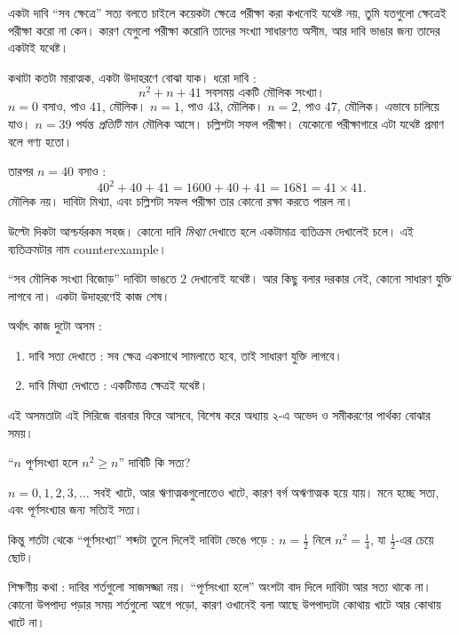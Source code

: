 \documentclass[11pt]{article}
\begin{document}
\begin{idea}[উদাহরণ দিয়ে দেখানো প্রমাণ নয়]
একটা দাবি ``সব ক্ষেত্রে'' সত্য বলতে চাইলে কয়েকটা ক্ষেত্রে পরীক্ষা করা কখনোই
যথেষ্ট নয়, তুমি যতগুলো ক্ষেত্রেই পরীক্ষা করো না কেন। কারণ যেগুলো পরীক্ষা করোনি
তাদের সংখ্যা সাধারণত অসীম, আর দাবি ভাঙার জন্য তাদের একটাই যথেষ্ট।

কথাটা কতটা মারাত্মক, একটা উদাহরণে বোঝা যাক। ধরো দাবি :
\[
  n^2 + n + 41 \text{ সবসময় একটি মৌলিক সংখ্যা।}
\]
$n = 0$ বসাও, পাও $41$, মৌলিক। $n = 1$, পাও $43$, মৌলিক। $n = 2$, পাও $47$,
মৌলিক। এভাবে চালিয়ে যাও। $n = 39$ পর্যন্ত \emph{প্রতিটি} মান মৌলিক আসে।
চল্লিশটা সফল পরীক্ষা। যেকোনো পরীক্ষাগারে এটা যথেষ্ট প্রমাণ বলে গণ্য হতো।

তারপর $n = 40$ বসাও :
\[
  40^2 + 40 + 41 = 1600 + 40 + 41 = 1681 = 41 \times 41 .
\]
মৌলিক নয়। দাবিটা মিথ্যা, এবং চল্লিশটা সফল পরীক্ষা তার কোনো রক্ষা করতে পারল না।
\end{idea}

\begin{idea}
উল্টো দিকটা আশ্চর্যরকম সহজ। কোনো দাবি \emph{মিথ্যা} দেখাতে হলে একটামাত্র
ব্যতিক্রম দেখালেই চলে। এই ব্যতিক্রমটার নাম counterexample।

``সব মৌলিক সংখ্যা বিজোড়'' দাবিটা ভাঙতে $2$ দেখানোই যথেষ্ট। আর কিছু বলার দরকার
নেই, কোনো সাধারণ যুক্তি লাগবে না। একটা উদাহরণেই কাজ শেষ।

অর্থাৎ কাজ দুটো অসম :
\begin{enumerate}
  \item দাবি সত্য দেখাতে : সব ক্ষেত্র একসাথে সামলাতে হবে, তাই সাধারণ যুক্তি লাগবে।
  \item দাবি মিথ্যা দেখাতে : একটিমাত্র ক্ষেত্রই যথেষ্ট।
\end{enumerate}
এই অসমতাটা এই সিরিজে বারবার ফিরে আসবে, বিশেষ করে অধ্যায় ২-এ অভেদ ও
সমীকরণের পার্থক্য বোঝার সময়।
\end{idea}

\begin{example}
``$n$ পূর্ণসংখ্যা হলে $n^2 \geq n$'' \; দাবিটি কি সত্য?
\end{example}

\begin{solbox}
$n = 0, 1, 2, 3, \dots$ সবই খাটে, আর ঋণাত্মকগুলোতেও খাটে, কারণ বর্গ অঋণাত্মক
হয়ে যায়। মনে হচ্ছে সত্য, এবং পূর্ণসংখ্যার জন্য সত্যিই সত্য।

কিন্তু শর্তটা থেকে ``পূর্ণসংখ্যা'' শব্দটা তুলে দিলেই দাবিটা ভেঙে পড়ে :
$n = \tfrac{1}{2}$ নিলে $n^2 = \tfrac{1}{4}$, যা $\tfrac{1}{2}$-এর চেয়ে ছোট।

শিক্ষণীয় কথা : দাবির শর্তগুলো সাজসজ্জা নয়। ``পূর্ণসংখ্যা হলে'' অংশটা বাদ দিলে
দাবিটা আর সত্য থাকে না। কোনো উপপাদ্য পড়ার সময় শর্তগুলো আগে পড়ো, কারণ
ওখানেই বলা আছে উপপাদ্যটা কোথায় খাটে আর কোথায় খাটে না।
\end{solbox}
\end{document}
